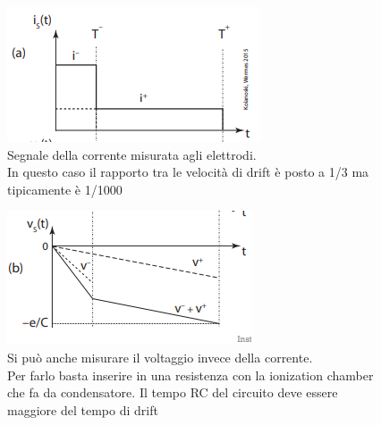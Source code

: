 \begin{minipage}{0.48\textwidth}
    \vspace{-2pt}
    \begin{figure}[H]
        \centering
        \captionsetup{width=\textwidth}
        \caption{Segnale della corrente misurata agli elettrodi.\\ In questo caso il rapporto tra le velocità di drift è posto a 1/3 ma tipicamente è 1/1000}
        \vspace{-7pt}
        \includegraphics[width=\textwidth,frame]{Chapters/images/Interazione_radiazione_materia/image-20220223211327802.png}

        \label{fig:}
    \end{figure}
    \vspace{-30pt}
    \begin{figure}[H]
        \centering
        \includegraphics[width=\textwidth,frame]{Chapters/images/Interazione_radiazione_materia/image-20220223212101007.png}
        \captionsetup{width=\textwidth}
        \vspace{-23pt}
        \caption{Si può anche misurare il voltaggio invece della corrente.\\ 
        Per farlo basta inserire in una resistenza con la ionization chamber che fa da condensatore. Il tempo RC  del circuito deve essere maggiore del tempo di drift}
        \label{fig:}
    \end{figure}
\end{minipage} \hfill
